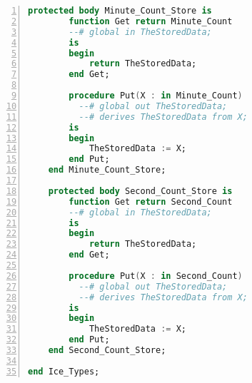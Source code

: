 \begin{lstlisting}[language=ada, gobble=0, numbers=left, caption={\lstinline{Ice_Types} package}, label={listing:pca_generated:ice_types}]
    protected body Minute_Count_Store is
        function Get return Minute_Count
        --# global in TheStoredData;
        is
        begin
            return TheStoredData;
        end Get;

        procedure Put(X : in Minute_Count)
          --# global out TheStoredData;
          --# derives TheStoredData from X;
        is
        begin
            TheStoredData := X;
        end Put;
    end Minute_Count_Store;

    protected body Second_Count_Store is
        function Get return Second_Count
        --# global in TheStoredData;
        is
        begin
            return TheStoredData;
        end Get;

        procedure Put(X : in Second_Count)
          --# global out TheStoredData;
          --# derives TheStoredData from X;
        is
        begin
            TheStoredData := X;
        end Put;
    end Second_Count_Store;

end Ice_Types;
\end{lstlisting} 
\doublespacing


